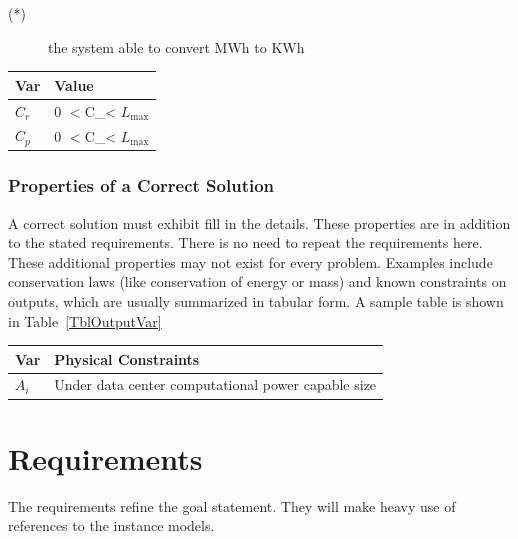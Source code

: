 \documentclass[12pt]{article}
\begin{document}
\noindent 
\begin{description}
\item[(*)] {the system able to convert MWh to KWh}
\end{description}

\begin{table}[!h]
\caption{Specification Parameter Values} \label{TblSpecParams}
\renewcommand{\arraystretch}{1.2}
\noindent \begin{longtable*}{l l} 
  \toprule
  \textbf{Var} & \textbf{Value} \\
  \midrule 
  $C_r$ & 0 $< $C_$ $< $L_\text{max}$\\
  $C_p$ & 0 $< $C_$ $< $L_\text{max}$\\
  \bottomrule
\end{longtable*}
\end{table}

\subsubsection{Properties of a Correct Solution} \label{sec_CorrectSolution}

\noindent
A correct solution must exhibit {fill in the details}.  {These
  properties are in addition to the stated requirements.  There is no need to
  repeat the requirements here.  These additional properties may not exist for
  every problem.  Examples include conservation laws (like conservation of
  energy or mass) and known constraints on outputs, which are usually summarized
  in tabular form.  A sample table is shown in Table~\ref{TblOutputVar}}

\begin{table}[!h]
\caption{Output Variables} \label{TblOutputVar}
\renewcommand{\arraystretch}{1.2}
\noindent \begin{longtable*}{l l} 
  \toprule
  \textbf{Var} & \textbf{Physical Constraints} \\
  \midrule 
  $A_i$ & Under data center computational power capable size
  \\
  \bottomrule
\end{longtable*}
\end{table}


\section{Requirements}

{The requirements refine the goal statement.  They will make heavy use of
  references to the instance models.}
\end{document}
